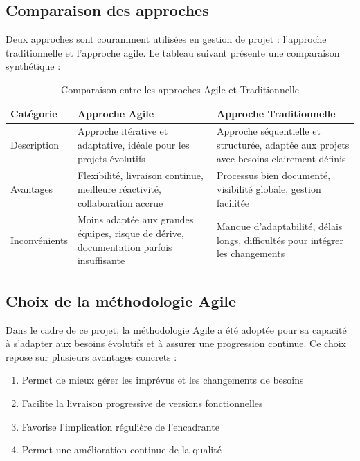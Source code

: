 \documentclass[12pt,a4paper]{report}
\begin{document}
\subsection{Comparaison des approches}

Deux approches sont couramment utilisées en gestion de projet : l'approche traditionnelle et l'approche agile. Le tableau suivant présente une comparaison synthétique :

\begin{table}[h]
\centering
\begin{tabular}{|p{3cm}|p{5.5cm}|p{5.5cm}|}
\hline
\textbf{Catégorie} & \textbf{Approche Agile} & \textbf{Approche Traditionnelle} \\
\hline
Description & Approche itérative et adaptative, idéale pour les projets évolutifs & Approche séquentielle et structurée, adaptée aux projets avec besoins clairement définis \\
\hline
Avantages & Flexibilité, livraison continue, meilleure réactivité, collaboration accrue & Processus bien documenté, visibilité globale, gestion facilitée \\
\hline
Inconvénients & Moins adaptée aux grandes équipes, risque de dérive, documentation parfois insuffisante & Manque d'adaptabilité, délais longs, difficultés pour intégrer les changements \\
\hline
\end{tabular}
\caption{Comparaison entre les approches Agile et Traditionnelle}
\end{table}

\subsection{Choix de la méthodologie Agile}

Dans le cadre de ce projet, la méthodologie Agile a été adoptée pour sa capacité à s'adapter aux besoins évolutifs et à assurer une progression continue. Ce choix repose sur plusieurs avantages concrets :

\begin{enumerate}
    \item Permet de mieux gérer les imprévus et les changements de besoins
    \item Facilite la livraison progressive de versions fonctionnelles
    \item Favorise l'implication régulière de l'encadrante
    \item Permet une amélioration continue de la qualité
\end{enumerate}
\end{document}
